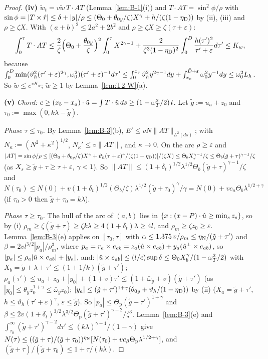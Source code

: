 \begin{proof}
\textbf{(iv)} $\tilde w_t=v\tilde w\,T\cdot AT$ (Lemma~\ref{lem:B-1}(i)) and $T\cdot AT=\sin^2\!\phi/\rho$ with
$\sin\phi=|T\times\hat r|\le\delta+|y|/\rho\le(\Theta_0+\theta_{0y}/\zeta)X^\gamma+h/(\zeta(1-\eta_{\mathrm D}))$ by (ii), (iii) and
$\rho\ge\zeta X$. With $(a+b)^2\le2a^2+2b^2$ and $\rho\ge\zeta X\ge\zeta(\tau+\varepsilon)$:
\[
\int_0^\tau T\cdot AT\le\frac2\zeta\Bigl(\Theta_0+\frac{\theta_{0y}}\zeta\Bigr)^2\int_0^\tau X^{2\gamma-1}
+\frac2{\zeta^3(1-\eta_{\mathrm D})^2}\int_0^D\frac{h(\tau')^2}{\tau'+\varepsilon}d\tau'\le K_w,
\]
because $\int_0^D\min(\vartheta_h^2(\tau'+\varepsilon)^{2\gamma},\omega_0^2)(\tau'+\varepsilon)^{-1}d\tau'\le\int_0^{x_c}\vartheta_h^2y^{2\gamma-1}dy
+\int_{x_c}^{\bar D+\varepsilon}\omega_0^2y^{-1}dy\le\omega_0^2L_h$. So $\tilde w\le e^{vK_w}$; $\tilde w\ge1$ by Lemma~\ref{lem:T2-W}(a).

\textbf{(v)} \emph{Chord:} $c\ge(x_b-x_a)\cdot\hat u=\int T\cdot\hat u\,ds\ge(1-\omega_T^2/2)\,l$. Let $\tilde g:=u_a+z_0$ and
$\tau_0:=\max(0,k\lambda-\tilde g)$.

\emph{Phase $\tau\le\tau_0$.} By Lemma~\ref{lem:B-3}(b), $E'\le vN\|AT\|_{L^2(ds)}$; with $N_\kappa:=(N^2+\kappa^2)^{1/2}$,
$N_\kappa'\le v\|AT\|$, and $\kappa\to0$. On the arc $\rho\ge\varepsilon$ and
$|AT|=\sin\phi/\rho\le[(\Theta_0+\theta_{0y}/\zeta)X^\gamma+\vartheta_h(\tau+\varepsilon)^\gamma/(\zeta(1-\eta_{\mathrm D}))]/(\zeta X)
\le\Theta_bX_s^{\gamma-1}/\zeta\le\Theta_b(\tilde g+\tau)^{\gamma-1}/\zeta$ (as $X_s\ge\tilde g+\tau\ge\tau+\varepsilon$, $\gamma<1$). So
$\|AT\|\le(1+\delta_t)^{1/2}\lambda^{1/2}\Theta_b(\tilde g+\tau)^{\gamma-1}/\zeta$ and
$N(\tau_0)\le N(0)+v(1+\delta_t)^{1/2}(\Theta_b/\zeta)\lambda^{1/2}(\tilde g+\tau_0)^\gamma/\gamma=N(0)+vc_n\Theta_b\lambda^{1/2+\gamma}$
(if $\tau_0>0$ then $\tilde g+\tau_0=k\lambda$).

\emph{Phase $\tau\ge\tau_0$.} The hull of the arc of $(a,b)$ lies in $\{x:(x-P)\cdot\hat u\ge\min_sz_s\}$, so by (i)
$\rho_m\ge\zeta(\tilde g+\tau)\ge\zeta k\lambda\ge4(1+\delta_t)\lambda\ge4l$, and $\rho_m\ge\zeta z_0\ge\varepsilon$.
Lemma~\ref{lem:B-3}(e) applies on $[\tau_0,\tau]$ with $\alpha\le1.375\,v/\rho_m\le\eta_{\mathrm N}/(\tilde g+\tau')$ and
$\beta=2vl^{3/2}|p_a|/\rho_m^3$, where $p_a=r_a\times e_{ab}=z_a(\hat u\times e_{ab})+y_a(\hat u^\perp\times e_{ab})$, so
$|p_a|\le\rho_a|\hat u\times e_{ab}|+|y_a|$, and:
$|\hat u\times e_{ab}|\le(l/c)\sup\delta\le\Theta_0X_b^\gamma/(1-\omega_T^2/2)$ with $X_b=\tilde g+\lambda+\tau'\le(1+1/k)(\tilde g+\tau')$;
$\rho_a(\tau')\le u_a+z_0+|y_0|+(1+v)\tau'\le(1+\bar\omega_y+v)(\tilde g+\tau')$ (as $|y_0|\le\theta_yz_0^{1+\gamma}\le\bar\omega_yz_0$);
$|y_a|\le(\tilde g+\tau')^{1+\gamma}(\theta_{0y}+\vartheta_h/(1-\eta_{\mathrm D}))$ by (ii) ($X_a=\tilde g+\tau'$,
$h\le\vartheta_h(\tau'+\varepsilon)^\gamma$, $\varepsilon\le\tilde g$). So $|p_a|\le\Theta_{\mathrm p}(\tilde g+\tau')^{1+\gamma}$ and
$\beta\le2v(1+\delta_t)^{3/2}\lambda^{3/2}\Theta_{\mathrm p}(\tilde g+\tau')^{\gamma-2}/\zeta^3$. Lemma~\ref{lem:B-3}(e) and
$\int_{\tau_0}^\infty(\tilde g+\tau')^{\gamma-2}d\tau'\le(k\lambda)^{\gamma-1}/(1-\gamma)$ give
$N(\tau)\le((\tilde g+\tau)/(\tilde g+\tau_0))^{\eta_{\mathrm N}}[N(\tau_0)+vc_\beta\Theta_{\mathrm p}\lambda^{1/2+\gamma}]$, and
$(\tilde g+\tau)/(\tilde g+\tau_0)\le1+\tau/(k\lambda)$.
\end{proof}

